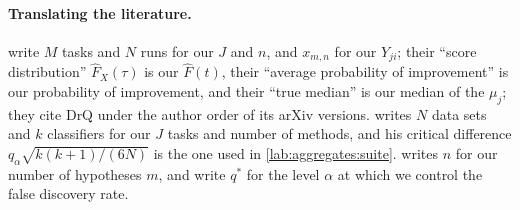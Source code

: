 \begin{refsection}
\paragraph{Translating the literature.} \Textcite{AgarwalEtAl2021} write $M$ tasks and $N$ runs for our $J$ and $n$, and $x_{m,n}$ for our $Y_{ji}$; their ``score distribution'' $\hat F_X(\tau)$ is our $\hat F(t)$, their ``average probability of improvement'' is our probability of improvement, and their ``true median'' is our median of the $\mu_j$; they cite DrQ under the author order of its arXiv versions. \Textcite{Demsar2006} writes $N$ data sets and $k$ classifiers for our $J$ tasks and number of methods, and his critical difference $q_\alpha\sqrt{k(k+1)/(6N)}$ is the one used in \cref{lab:aggregates:suite}. \Textcite{Holm1979} writes $n$ for our number of hypotheses $m$, and \textcite{BenjaminiHochberg1995} write $q^*$ for the level $\alpha$ at which we control the false discovery rate.

\printchapterbib
\end{refsection}
